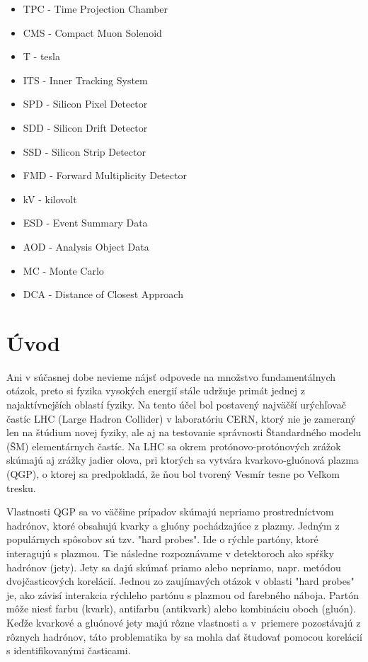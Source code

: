 \documentclass[thesismargins, thesislinespacing]{rnthesis}
\begin{document}
\begin{itemize}
	\item[] TPC - Time Projection Chamber
	\item[] CMS - Compact Muon Solenoid
	\item[] T - tesla
	\item[] ITS - Inner Tracking System
	\item[] SPD - Silicon Pixel Detector
	 \item[] SDD - Silicon Drift Detector
	 \item[] SSD - Silicon Strip Detector
	 \item[] FMD - Forward Multiplicity Detector
	 \item[] kV - kilovolt
	 \item[] ESD - Event Summary Data
	 \item[] AOD - Analysis Object Data
	 \item[] MC - Monte Carlo
	 \item[] DCA - Distance of Closest Approach 
	 
\end{itemize}
\newpage


\chapter*{Úvod}
Ani v súčasnej dobe nevieme nájsť odpovede na množstvo fundamentálnych otázok, preto si fyzika vysokých energií stále udržuje primát jednej z najaktívnejších oblastí fyziky. Na tento účel bol postavený najväčší urýchľovač častíc LHC (Large Hadron Collider) v laboratóriu CERN, ktorý nie je zameraný len na štúdium novej fyziky, ale aj na testovanie správnosti Štandardného modelu (ŠM) elementárnych častíc. Na LHC sa okrem protónovo-protónových zrážok skúmajú aj zrážky jadier olova, pri ktorých  sa vytvára kvarkovo-gluónová plazma (QGP), o ktorej sa predpokladá, že ňou bol tvorený Vesmír tesne po Veľkom tresku. 

Vlastnosti QGP sa vo väčšine prípadov skúmajú nepriamo prostredníctvom \-had\-ró\-nov, ktoré obsahujú kvarky a gluóny pochádzajúce z plazmy. Jedným z populárnych \-spô\-so\-bov sú tzv. "hard probes". Ide o rýchle partóny, ktoré interagujú s plazmou. Tie následne rozpoznávame v detektoroch ako spŕšky hadrónov (jety). Jety sa dajú skúmať \-pria\-mo alebo nepriamo, napr. metódou dvojčasticových korelácií. Jednou zo zaujímavých otázok v oblasti "hard probes" \-je, ako závisí interakcia rýchleho partónu s plazmou od farebného náboja. Partón môže niesť farbu (kvark), antifarbu (antikvark) alebo kombináciu oboch (gluón). Keďže kvarkové a gluónové jety majú rôzne vlastnosti a v~priemere pozostávajú z rôznych hadrónov, táto problematika by sa mohla dať študovať pomocou korelácií s identifikovanými časticami.  
\end{document}

